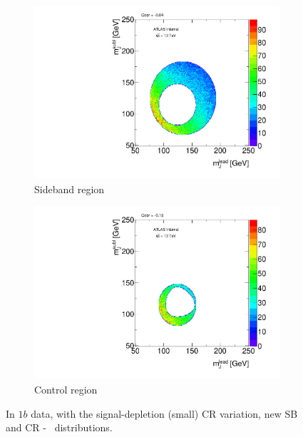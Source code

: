 \begin{figure}[htbp!]
\centering
\captionsetup{justification=centering}
    \begin{subfigure}[b]{0.39\textwidth}
        \includegraphics[width=\textwidth,angle=-90]{figures/boosted/Syst_CRSB/CR_Small_Sideband_OneTag_mH0H1.pdf}
        \caption{Sideband region}
        \label{CRSB:CR_Small_SB}
    \end{subfigure}
    \quad
    \begin{subfigure}[b]{0.39\textwidth}
        \includegraphics[width=\textwidth,angle=-90]{figures/boosted/Syst_CRSB/CR_Small_Control_OneTag_mH0H1.pdf}
        \caption{Control region}
        \label{CRSB:CR_Small_CR}
    \end{subfigure}
\caption{In $1b$ data, with the signal-depletion (small) CR variation, new SB and CR \mleadJ-\msublJ~ distributions.}
\label{CRSB:CR_Small}
\end{figure}

